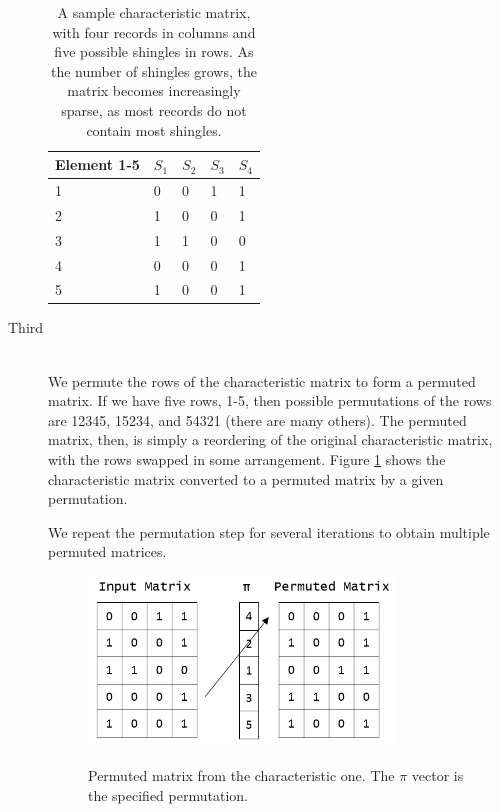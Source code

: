 \documentclass[11pt]{article}
\begin{document}
\begin{description}
\begin{table}[h]
\begin{center}
\begin{tabular}{@{}lllll@{}}
\toprule
Element 1-5 & $S_{1}$ & $S_{2}$ & $S_{3}$ & $S_{4}$ \\ \midrule
1   & 0       & 0       & 1       & 1       \\
2   & 1       & 0       & 0       & 1       \\
3   & 1       & 1       & 0       & 0       \\
4   & 0       & 0       & 0       & 1       \\
5   & 1       & 0       & 0       & 1       \\ \bottomrule
\end{tabular}
\label{table:samplemat}
\caption{A sample characteristic matrix, with four records in columns and five possible shingles in rows. As the number of shingles grows, the matrix becomes increasingly sparse, as most records do not contain most shingles.}
\end{center}
\end{table}

\item[Third] \hfill \\
We permute the rows of the characteristic matrix to form a permuted matrix. If we have five rows, 1-5, then possible permutations of the rows are 12345, 15234, and 54321 (there are many others). The permuted matrix, then, is simply a reordering of the original characteristic matrix, with the rows swapped in some arrangement. Figure \ref{fig:permuted} shows the characteristic matrix converted to a permuted matrix by a given permutation.

We repeat the permutation step for several iterations to obtain multiple permuted matrices. 

\begin{figure}[!h]
\begin{center}
\includegraphics[width=0.8\textwidth]{permuted-matrix.png}
\label{fig:permuted}
\caption{Permuted matrix from the characteristic one. The $\pi$ vector is the specified permutation.}
\end{center}
\end{figure}


\end{description}
\end{document}
